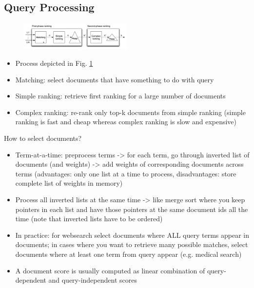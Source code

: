 \subsection{Query Processing}
\begin{figure}[h!]
	\centering
	\includegraphics[width=0.5\textwidth]{figures/query_processing.png}
	\label{img:query_processing}
\end{figure}
\begin{itemize}
	\item Process depicted in Fig. \ref{img:query_processing}
	\item Matching: select documents that have something to do with query
	\item Simple ranking: retrieve first ranking for a large number of documents
	\item Complex ranking: re-rank only top-k documents from simple ranking (simple ranking is fast and cheap whereas complex ranking is slow and expensive)
\end{itemize}
How to select documents?
\begin{itemize}
	\item Term-at-a-time: preprocess terms -> for each term, go through inverted list of documents (and weights) -> add weights of corresponding documents across terms (advantages: only one list at a time to process, disadvantages: store complete list of weights in memory)
	\item Process all inverted lists at the same time -> like merge sort where you keep pointers in each list and have those pointers at the same document ids all the time (note that inverted lists have to be ordered)
	\item In practice: for websearch select documents where ALL query terms appear in documents; in cases where you want to retrieve many possible matches, select documents where at least one term from query appear (e.g. medical search)
	\item A document score is usually computed as linear combination of query-dependent and query-independent scores
\end{itemize}
